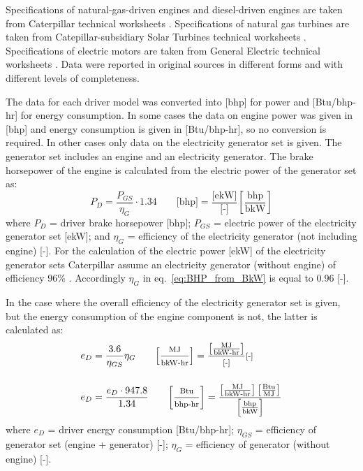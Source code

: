 \documentclass[11pt]{report}
\begin{document}
{{{{Specifications of natural-gas-driven engines and diesel-driven engines are taken from Caterpillar technical worksheets \cite{Caterpillar2012}. Specifications of natural gas turbines are taken from Catepillar-subsidiary Solar Turbines technical worksheets \cite{Solarturbines2012}. Specifications of electric motors are taken from General Electric technical worksheets \cite{GE2011}. Data were reported in original sources in different forms and with different levels of completeness.

The data for each driver model was converted into [bhp] for power and [Btu/bhp-hr] for energy consumption. In some cases the data on engine power was given in [bhp] and energy consumption is given in [Btu/bhp-hr], so no conversion is required. In other cases only data on the electricity generator set is given. The generator set includes an engine and an electricity generator. The brake horsepower of the engine is calculated from the electric power of the generator set as:
\begin{equation}\label{eq:BHP_from_BkW}
P_{D}= \frac{P_{GS}}{\eta_{G}} \cdot 1.34 \quad\quad\text{[bhp]} = \frac{\text{[ekW]}}{\text{[-]}}\left[\frac{\text{bhp}}{\text{bkW}}\right] 
\end{equation}
where $P_{D}$ = driver brake horsepower [bhp]; $P_{GS}$ = electric power of the electricity generator set [ekW]; and $\eta_{G}$ = efficiency of the electricity generator (not including engine) [-]. For the calculation of the electric power [ekW] of the electricity generator sets Caterpillar assume an electricity generator (without engine) of efficiency 96\% \cite[p. 4]{Caterpillar2012b}. Accordingly $\eta_{G}$ in eq.\ \eqref{eq:BHP_from_BkW} is equal to 0.96 [-].


In the case where the overall efficiency of the electricity generator set is given, but the energy consumption of the engine component is not, the latter is calculated as:
\begin{equation} \label{eq:calc_EC_eff}
\begin{split}
& e_{D} = \frac{3.6}{\eta_{GS}} \eta_{G} \quad \quad \footnotesize{ \left[\frac{\text{MJ}}{\text{bkW-hr}}\right] = \frac{\left[\frac{\text{MJ}}{\text{bkW-hr}}\right]}{\text{[-]}}\text{[-]}} \\ 
\\
& e_{D} = \frac{e_{D} \cdot 947.8}{1.34} \quad\quad \footnotesize{\left[\frac{\text{Btu}}{\text{bhp-hr}}\right] = \frac{\left[\frac{\text{MJ}}{\text{bkW-hr}}\right] \left[\frac{\text{Btu}}{\text{MJ}}\right] } {\left[\frac{\text{bhp}}{\text{bkW}} \right] }}
\end{split}
\end{equation}
where $e_{D}$ = driver energy consumption [Btu/bhp-hr]; $\eta_{GS}$ = efficiency of generator set (engine + generator) [-]; $\eta_{G}$ = efficiency of generator (without engine) [-].

}}}}
\end{document}
